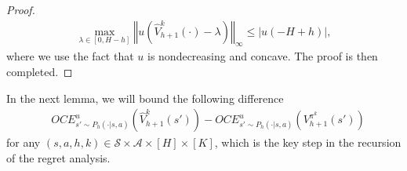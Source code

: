 \documentclass[11pt]{article}
\newcommand{\1}{\mathbbm{1}}
\begin{document}
\begin{proof}
\begin{align*}
\max_{\lambda\in [0,H-h]}\left\Vert u(\hat{V}_{h+1}^k(\cdot)-\lambda)\right\Vert_{\infty} \le \vert u(-H+h)\vert,
\end{align*}
where we use the fact that $u$ is nondecreasing and concave. The proof is then completed. 
\end{proof}








In the next lemma, we will bound the following difference
\begin{equation}\label{EQ16}
\begin{aligned}
&OCE^{u}_{s'\sim P_h(\cdot\vert s,a)}\left (\hat{V}_{h+1}^k(s')\right )-OCE^{u}_{s'\sim P_h(\cdot\vert s,a)}\left (V_{h+1}^{\pi^k}(s')\right )
\end{aligned}
\end{equation}
 for any $(s,a,h,k)\in \mathcal{S}\times \mathcal{A}\times [H]\times [K]$, which is the key step in the recursion of the regret analysis. 
 
 
\end{document}
